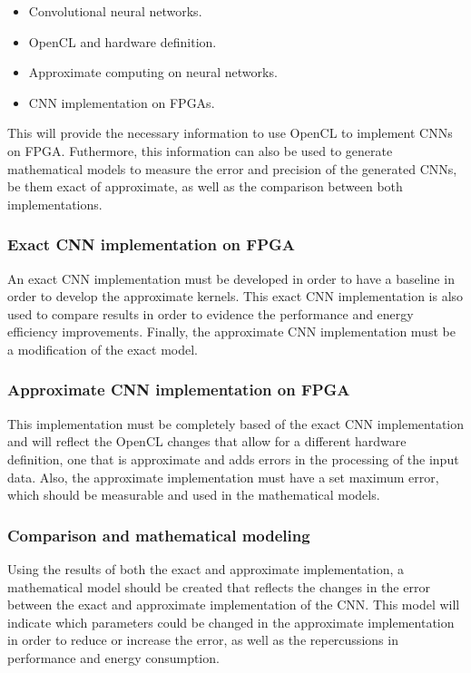 \begin{itemize}
    \item Convolutional neural networks.
    \item OpenCL and hardware definition.
    \item Approximate computing on neural networks.
    \item CNN implementation on FPGAs.
\end{itemize}

This will provide the necessary information to use OpenCL to implement CNNs on FPGA.
Futhermore, this information can also be used to generate mathematical models to measure the error
and precision of the generated CNNs, be them exact of approximate, as well as the comparison between
both implementations.

\subsubsection{Exact CNN implementation on FPGA}

An exact CNN implementation must be developed in order to have a baseline in order
to develop the approximate kernels. This exact CNN implementation is also used to
compare results in order to evidence the performance and energy efficiency improvements.
Finally, the approximate CNN implementation must be a modification of the exact model.

\subsubsection{Approximate CNN implementation on FPGA}

This implementation must be completely based of the exact CNN implementation and will 
reflect the OpenCL changes that allow for a different hardware definition, one that is 
approximate and adds errors in the processing of the input data. Also, the approximate
implementation must have a set maximum error, which should be measurable and used
in the mathematical models.

\subsubsection{Comparison and mathematical modeling}

Using the results of both the exact and approximate implementation, a mathematical model
should be created that reflects the changes in the error between the exact and
approximate implementation of the CNN. This model will indicate which parameters could
be changed in the approximate implementation in order to reduce or increase the error, as well
as the repercussions in performance and energy consumption.


